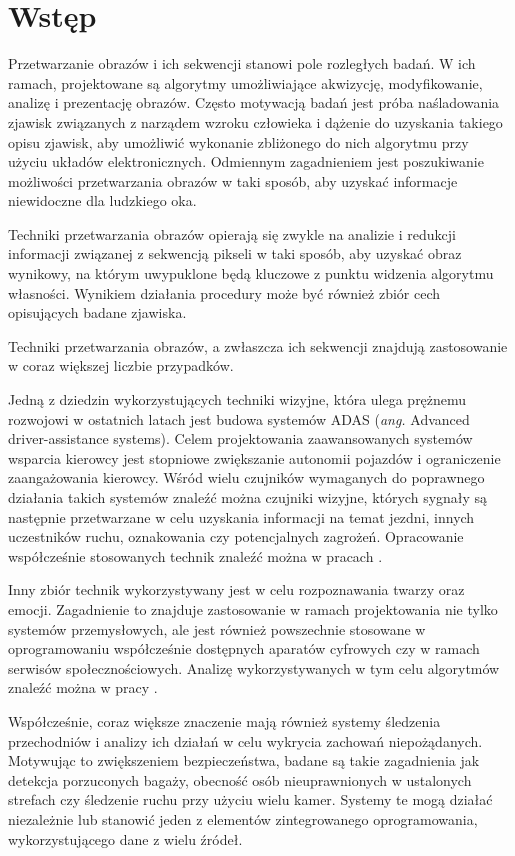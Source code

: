 \chapter{Wstęp}
\label{cha:intruduction}

Przetwarzanie obrazów i ich sekwencji stanowi pole rozległych badań. W ich ramach, projektowane są algorytmy umożliwiające akwizycję, modyfikowanie, analizę i prezentację obrazów. Często motywacją badań jest próba naśladowania zjawisk związanych z narządem wzroku człowieka i dążenie do uzyskania takiego opisu zjawisk, aby umożliwić wykonanie zbliżonego do nich algorytmu przy użyciu układów elektronicznych. Odmiennym zagadnieniem jest poszukiwanie możliwości przetwarzania obrazów w taki sposób, aby uzyskać informacje niewidoczne dla ludzkiego oka.

Techniki przetwarzania obrazów opierają się zwykle na analizie i redukcji informacji związanej z sekwencją pikseli w taki sposób, aby uzyskać obraz wynikowy, na którym uwypuklone będą kluczowe z punktu widzenia algorytmu własności. Wynikiem działania procedury może być również zbiór cech opisujących badane zjawiska.

Techniki przetwarzania obrazów, a zwłaszcza ich sekwencji znajdują zastosowanie w coraz większej liczbie przypadków.

Jedną z dziedzin wykorzystujących techniki wizyjne, która ulega prężnemu rozwojowi w ostatnich latach jest budowa systemów ADAS (\emph{ang.} Advanced driver-assistance systems). Celem projektowania zaawansowanych systemów wsparcia kierowcy jest stopniowe zwiększanie autonomii pojazdów i ograniczenie zaangażowania kierowcy. Wśród wielu czujników wymaganych do poprawnego działania takich systemów znaleźć można czujniki wizyjne, których sygnały są następnie przetwarzane w celu uzyskania informacji na temat jezdni, innych uczestników ruchu, oznakowania czy potencjalnych zagrożeń. Opracowanie współcześnie stosowanych technik znaleźć można w pracach \cite{Bengler2014,Velez2017}.

Inny zbiór technik wykorzystywany jest w celu rozpoznawania twarzy oraz emocji. Zagadnienie to znajduje zastosowanie w ramach projektowania nie tylko systemów przemysłowych, ale jest również powszechnie stosowane w oprogramowaniu współcześnie dostępnych aparatów cyfrowych czy w ramach serwisów społecznościowych. Analizę wykorzystywanych w tym celu algorytmów znaleźć można w pracy \cite{Anil2016}.

Współcześnie, coraz większe znaczenie mają również systemy śledzenia przechodniów i analizy ich działań w celu wykrycia zachowań niepożądanych. Motywując to zwiększeniem bezpieczeństwa, badane są takie zagadnienia jak detekcja porzuconych bagaży, obecność osób nieuprawnionych w ustalonych strefach czy śledzenie ruchu przy użyciu wielu kamer. Systemy te mogą działać niezależnie lub stanowić jeden z elementów zintegrowanego oprogramowania, wykorzystującego dane z wielu źródeł. \cite{Sriram2016,Hussain2016,Gouo2015}

